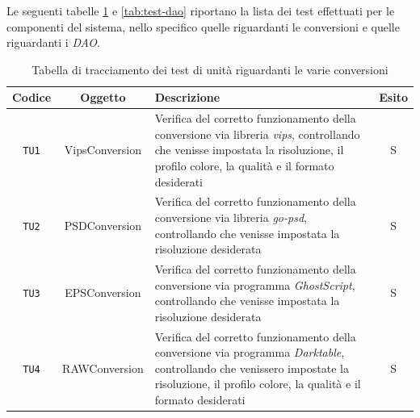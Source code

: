 Le seguenti tabelle \ref{tab:test-conversioni} e \ref{tab:test-dao} riportano la
lista dei test effettuati per le componenti del sistema, nello specifico quelle
riguardanti le conversioni e quelle riguardanti i \emph{DAO}.
\begin{table}[H]
    \caption{Tabella di tracciamento dei test di unità riguardanti le varie conversioni}
    \label{tab:test-conversioni}
    \centering
    \begin{tabularx}{\textwidth}{|c|c|X|c|}
        \hline
        \textbf{Codice} & \textbf{Oggetto} & \textbf{Descrizione}                                                                                                                                                                             & \textbf{Esito} \\
        \hline
        \verb|TU1|      & VipsConversion   & Verifica del corretto funzionamento della conversione via libreria \emph{vips}, controllando che venisse impostata la risoluzione, il profilo colore, la qualità e il formato desiderati         & S              \\
        \hline
        \verb|TU2|      & PSDConversion    & Verifica del corretto funzionamento della conversione via libreria \emph{go-psd}, controllando che venisse impostata la risoluzione desiderata                                                   & S              \\
        \hline
        \verb|TU3|      & EPSConversion    & Verifica del corretto funzionamento della conversione via programma \emph{GhostScript}, controllando che venisse impostata la risoluzione desiderata                                             & S              \\
        \hline
        \verb|TU4|      & RAWConversion    & Verifica del corretto funzionamento della conversione via programma \emph{Darktable}, controllando che venissero impostate la risoluzione, il profilo colore, la qualità e il formato desiderati & S              \\
        \hline
    \end{tabularx}
\end{table}

